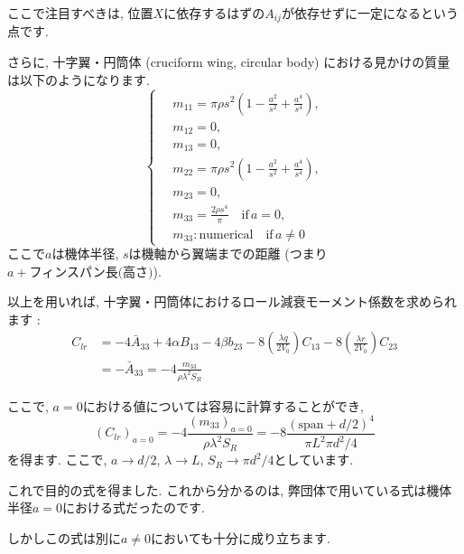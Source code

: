 \documentclass[uplatex,dvipdfmx,a4j,11  pt]{jsarticle}
\begin{document}
ここで注目すべきは, 位置$X$に依存するはずの$A_{ij}$が依存せずに一定になるという点です.

さらに, 十字翼・円筒体 (cruciform wing, circular body) における見かけの質量 は以下のようになります.
\begin{equation}
  \left\{ 
  \begin{alignedat}{2}
    \,&m_{11} = \pi \rho s^2 \left(1 - \frac{a^2}{s^2} + \frac{a^4}{s^4}\right),\\
    \,&m_{12} = 0,\\
    \,&m_{13} = 0,\\
    \,&m_{22} = \pi \rho s^2 \left(1 - \frac{a^2}{s^2} + \frac{a^4}{s^4}\right),\\
    \,&m_{23} = 0,\\
    \,&m_{33} = \frac{2\rho s^4}{\pi}\quad  \text{if}\, a = 0,\\
    \,&m_{33} : \text{numerical}\quad \text{if}\, a \ne 0
  \end{alignedat} 
  \right.
\end{equation}
ここで$a$は機体半径, $s$は機軸から翼端までの距離 (つまり$a + \text{フィンスパン長(高さ)}$).

以上を用いれば, 十字翼・円筒体におけるロール減衰モーメント係数を求められます :
\begin{align}
  C_{lr} &= -4 \bar{A}_{33} + 4 \alpha B_{13} - 4 \beta b_{23} - 8 \left(\frac{\lambda q}{2 V_0}\right) C_{13} - 8 \left(\frac{\lambda r}{2V_0}\right) C_{23}\nonumber\\
  &= -\bar{A}_{33} = -4\frac{m_{33}}{\rho\lambda^2 S_R}
\end{align}

ここで, $a = 0$における値については容易に計算することができ,
\begin{equation}
  (C_{lr})_{a = 0} =  -4\frac{(m_{33})_{a = 0}}{\rho\lambda^2 S_R}= -8 \frac{(\text{span} + d/2)^4}{\pi L^2 \pi d^2/4}
\end{equation}
を得ます.
ここで, $a \to d / 2$, $\lambda \to L$, $S_R \to \pi d^2/4$としています.

これで目的の式を得ました.
これから分かるのは, 弊団体で用いている式は機体半径$a = 0$における式だったのです.

\enskip

しかしこの式は別に$a \ne 0$においても十分に成り立ちます.
\end{document}
